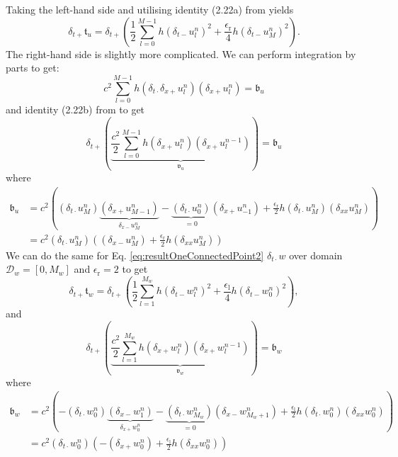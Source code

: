 \documentclass[dvipsnames]{article}
\begin{document}
Taking the left-hand side and utilising identity (2.22a) from \cite{Bilbao2009} yields
\begin{equation}
    \delta_{t+}\mathfrak{t}_u = \delta_{t+}\left(\frac{1}{2}\sum_{l=0}^{M-1}h(\delta_{t-}u_l^n)^2 + \frac{\epsilon_\text{r}}{4}h(\delta_{t-}u_M^n)^2\right).
\end{equation}
The right-hand side is slightly more complicated. We can perform integration by parts to get:
\begin{equation*}
    c^2 \sum_{l=0}^{M-1} h (\delta_{t\cdot}\delta_{x+}u_l^n)(\delta_{x+}u_l^n) = \mathfrak{b}_u
\end{equation*}
and identity (2.22b) from \cite{Bilbao2009} to get 
\begin{equation}
    \delta_{t+}\left(\underbrace{\frac{c^2}{2} \sum_{l=0}^{M-1} h (\delta_{x+}u_l^n)(\delta_{x+}u_l^{n-1})}_{\mathfrak{v}_u}\right) = \mathfrak{b}_u
\end{equation}
where
\begin{align}
    \mathfrak{b}_u &= c^2\left((\delta_{t\cdot}u_M^n)\underbrace{(\delta_{x+}u_{M-1}^n)}_{\delta_{x-}u_M^n}- \underbrace{(\delta_{t\cdot}u_0^n)}_{= 0}(\delta_{x+}u_{-1}^n)+\frac{\epsilon_\text{r}}{2}h(\delta_{t\cdot}u_M^n)(\delta_{xx}u_M^n)\right)\nonumber\\
    & = c^2(\delta_{t\cdot}u_M^n)\left((\delta_{x-}u_M^n)+\frac{\epsilon_\text{r}}{2}h(\delta_{xx}u_M^n)\right)
\end{align}
%
We can do the same for Eq. \eqref{eq:resultOneConnectedPoint2} $\delta_{t\cdot}w$ over domain $\mathcal{D}_w = [0, M_w]$ and $\epsilon_\text{r} = 2$ to get 
\begin{equation}
    \delta_{t+}\mathfrak{t}_w = \delta_{t+}\left(\frac{1}{2}\sum_{l=1}^{M_w} h(\delta_{t-}w_l^n)^2 + \frac{\epsilon_\text{l}}{4}h(\delta_{t-}w_0^n)^2\right),
\end{equation}
and 
\begin{equation}
    \delta_{t+}\left(\underbrace{\frac{c^2}2 \sum_{l=1}^{M_w} h (\delta_{x+}w_l^n)(\delta_{x+}w_l^{n-1})}_{\mathfrak{v}_w}\right) = \mathfrak{b}_w
\end{equation}
where
\begin{align}
    \mathfrak{b}_w &= c^2\left(-(\delta_{t\cdot}w_0^n)\underbrace{(\delta_{x-}w_{1}^n)}_{\delta_{x+}w_0^n}- \underbrace{(\delta_{t\cdot}w_{M_w}^n)}_{= 0}(\delta_{x-}w_{M_w+1}^n)+\frac{\epsilon_\text{l}}{2}h(\delta_{t\cdot}w_0^n)(\delta_{xx}w_0^n)\right)\nonumber\\
    &= c^2(\delta_{t\cdot}w_0^n)\left(-(\delta_{x+}w_0^n)+\frac{\epsilon_\text{l}}{2}h(\delta_{xx}w_0^n)\right)
\end{align}
\end{document}
